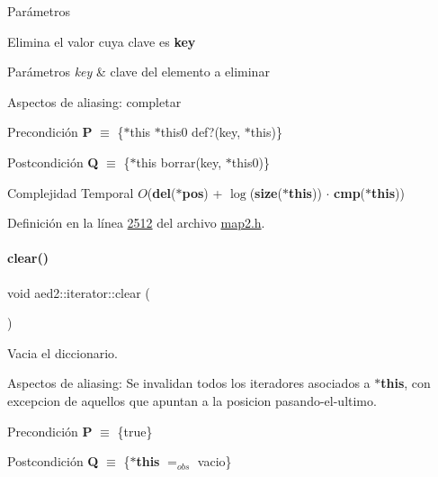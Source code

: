 \begin{DoxyParams}{\-Parámetros}
\begin{DoxyCompactItemize}
Elimina el valor cuya clave es {\bfseries key} 


\begin{DoxyParams}{Parámetros}
{\em key} & clave del elemento a eliminar\\
\hline
\end{DoxyParams}
\begin{DoxyParagraph}{Aspectos de aliasing\+:}
completar
\end{DoxyParagraph}
\begin{DoxyPrecond}{Precondición}
{\bfseries P} $\equiv$ \{$\ast$this  $\ast$this0  def?(key, $\ast$this)\} 
\end{DoxyPrecond}
\begin{DoxyPostcond}{Postcondición}
{\bfseries Q} $\equiv$ \{$\ast$this  borrar(key, $\ast$this0)\}
\end{DoxyPostcond}

\begin{DoxyDescription}
\item[Complejidad Temporal]$O$({\bfseries del}({\bfseries $\ast$pos}) + $\log$({\bfseries size}({\bfseries $\ast$this})) $\cdot$ {\bfseries cmp}({\bfseries $\ast$this}))
\end{DoxyDescription}

Definición en la línea \hyperlink{map2_8h_source_l02512}{2512} del archivo \hyperlink{map2_8h_source}{map2.\+h}.

\mbox{\label{classaed2_1_1iterator_ac98b533e402839c99d33d3118906c38f_ac98b533e402839c99d33d3118906c38f}} 
\paragraph{\texorpdfstring{clear()}{clear()}}
{\footnotesize\ttfamily void aed2\+::iterator\+::clear (\begin{DoxyParamCaption}{ }\end{DoxyParamCaption})\hspace{0.3cm}{\ttfamily [inline]}}



Vacia el diccionario. 

\begin{DoxyParagraph}{Aspectos de aliasing\+:}
Se invalidan todos los iteradores asociados a {\bfseries $\ast$this}, con excepcion de aquellos que apuntan a la posicion pasando-\/el-\/ultimo.
\end{DoxyParagraph}
\begin{DoxyPrecond}{Precondición}
{\bfseries P} $\equiv$ \{true\} 
\end{DoxyPrecond}
\begin{DoxyPostcond}{Postcondición}
{\bfseries Q} $\equiv$ \{{\bfseries $\ast$this} $=_{obs}$ vacio\}
\end{DoxyPostcond}


\end{DoxyCompactItemize}
\end{DoxyParams}
